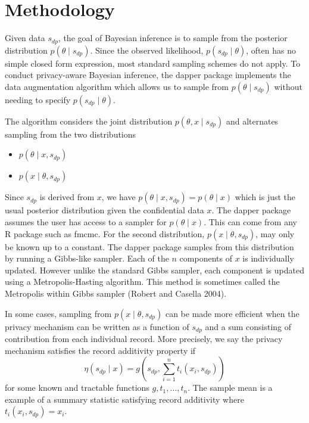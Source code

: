 \hypertarget{methodology}{%
\section{Methodology}\label{methodology}}

Given data \(s_{dp}\), the goal of Bayesian inference is to sample from the
posterior distribution \(p(\theta \mid s_{dp})\). Since the observed likelihood,
\(p(s_{dp} \mid \theta)\), often has no simple closed form expression, most standard
sampling schemes do not apply. To conduct privacy-aware Bayesian inference, the dapper package implements
the data augmentation algorithm which allows us to sample from \(p(\theta \mid s_{dp})\)
without needing to specify \(p(s_{dp} \mid \theta)\).

The algorithm considers the joint distribution \(p(\theta, x \mid s_{dp})\) and
alternates sampling from the two distributions

\begin{itemize}
\tightlist
\item
  \(p(\theta \mid x, s_{dp})\)
\item
  \(p(x \mid \theta, s_{dp})\)
\end{itemize}

Since \(s_{dp}\) is derived from \(x\), we have \(p(\theta \mid x, s_{dp}) = p(\theta \mid x)\) which
is just the usual posterior distribution given the confidential data \(x\). The dapper
package assumes the user has access to a sampler for \(p(\theta \mid x)\). This can
come from any R package such as fmcmc. For the second distribution, \(p(x \mid \theta, s_{dp})\), may
only be known up to a constant. The dapper package samples from this distribution by
running a Gibbs-like sampler. Each of the \(n\) components of \(x\) is individually
updated. However unlike the standard Gibbs sampler, each component is updated
using a Metropolis-Hasting algorithm. This method is sometimes called the Metropolis within Gibbs sampler (Robert and Casella 2004).

In some cases, sampling from \(p(x \mid \theta, s_{dp})\) can be made more efficient
when the privacy mechanism can be written as a function of \(s_{dp}\) and
a sum consisting of contribution from each individual record. More precisely, we say the privacy mechanism satisfies
the record additivity property if
\[
\eta(s_{dp} \mid x) = g(s_{dp}, \sum_{i=1}^{n}t_i(x_i, s_{dp}))
\]
for some known and tractable functions \(g, t_1, \ldots, t_n\). The sample mean is a
example of a summary statistic satisfying record additivity where \(t_i(x_i, s_{dp}) = x_i\).

